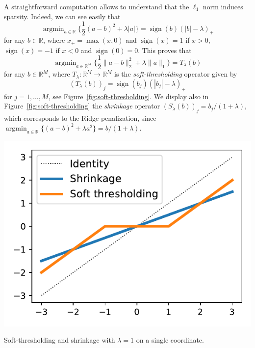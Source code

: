 \documentclass[
	fontsize=11pt, %
	twoside=false, %
	numbers=noenddot, %
]{kaobook}
\DeclareMathOperator*{\argmin}{argmin}
\newcommand{\R}{\mathbb R}
\newcommand{\norm}[1]{\| #1 \|}
\DeclareMathOperator{\sign}{sign}
\begin{document}
A straightforward computation allows to understand that the $\ell_1$ norm induces sparsity.
Indeed, we can see easily that
\begin{equation}
	\label{eq:soft-thresholding1}
	\argmin_{a \in \R} \{ \frac12 (a - b)^2 + \lambda |a| \Big\} 
	= \sign(b) (|b| - \lambda)_+
\end{equation}
for any $b \in \R$, where $x_+ = \max(x, 0)$ and $\sign(x) = 1$ if $x > 0$, $\sign(x) = -1$ if $x < 0$ and $\sign(0) = 0$.
This proves that
\begin{equation}
	\label{eq:soft-thresholding2}
	\argmin_{a \in \R^M} \Big\{ \frac12 \norm{a - b}_2^2 + \lambda \norm{a}_1 \Big\}
	= T_\lambda(b)
\end{equation}
for any $b \in \R^M$, where $T_\lambda : \R^M \rightarrow \R^M$ is the \emph{soft-thresholding} operator given by 
\begin{equation*}
	(T_\lambda(b))_j = \sign(b_j) (|b_j| - \lambda)_+
\end{equation*}
for $j=1, \ldots, M$, see Figure~\ref{fig:soft-thresholding}.
We display also in Figure~\ref{fig:soft-thresholding} the \emph{shrinkage} operator $(S_\lambda(b))_j = b_j / (1 + \lambda)$, which corresponds to the Ridge penalization, since $\argmin_{a \in \R} \{ (a - b)^2 + \lambda a^2 \} = b / (1 + \lambda)$.
\begin{marginfigure}[*-6]
	\includegraphics{assets/soft_thresholding.pdf}
	\caption{Soft-thresholding and shrinkage with $\lambda = 1$ on a single coordinate.}
	\label{fig:soft-thresholding}
\end{marginfigure}

\end{document}
